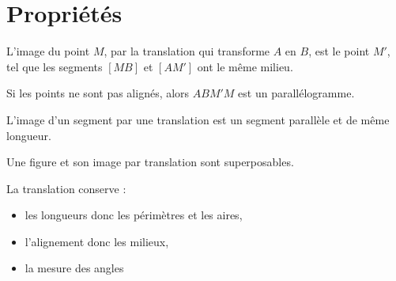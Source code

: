 \section{Propriétés}
\begin{propriete}[\admise]
    L'image du point $M$, par la translation qui transforme $A$ en $B$, est le point $M'$, tel que les segments $[MB]$ et $[AM']$ ont le même milieu.
\end{propriete}

\begin{remarque}
    Si les points ne sont pas alignés, alors $ABM'M$ est un parallélogramme.
\end{remarque}

\begin{propriete}[\admise]
    L'image d'un segment par une translation est un segment parallèle et de même longueur.
\end{propriete}

\begin{remarque}
    Une figure et son image par translation sont superposables.
\end{remarque}

\begin{propriete}
    La translation conserve :
    \begin{itemize}
        \item les longueurs donc les périmètres et les aires,
        \item l'alignement donc les milieux,
        \item la mesure des angles
    \end{itemize}
\end{propriete}

